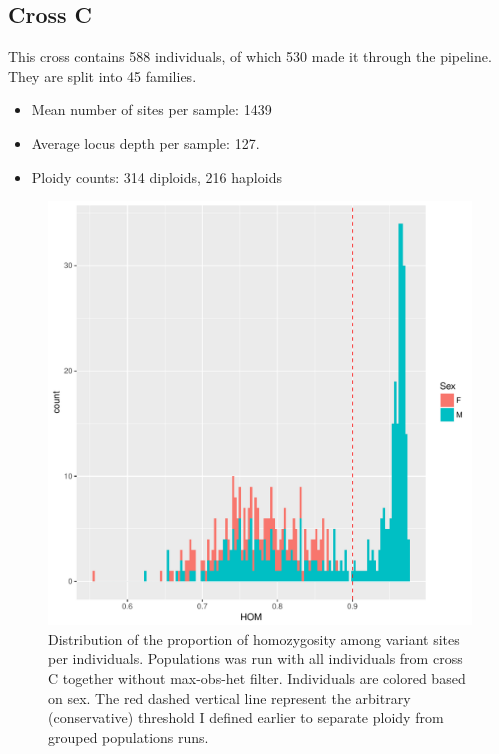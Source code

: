\documentclass[10pt,a4paper]{report}
\begin{document}
\subsection{Cross C}
This cross contains 588 individuals, of which 530 made it through the pipeline. They are split into 45 families. 
\begin{itemize}
\item Mean number of sites per sample: 1439
\item Average locus depth per sample: 127.
\item Ploidy counts: 314 diploids, 216 haploids
\end{itemize}

\begin{figure}
\begin{center}
\includegraphics[width=\textwidth]{final_samples/hom_Sex_popgroup_d20_C.pdf}
\caption{Distribution of the proportion of homozygosity among variant sites per individuals. Populations was run with all individuals from cross C together without max-obs-het filter. Individuals are colored based on sex. The red dashed vertical line represent the arbitrary (conservative) threshold I defined earlier to separate ploidy from grouped populations runs.}
\label{C_hom_grouped}
\end{center}
\end{figure}
\FloatBarrier
\end{document}
